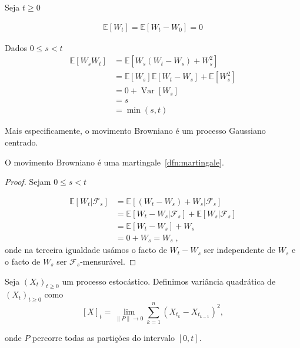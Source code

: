 \documentclass{article}
\begin{document}
Seja $t\geq 0$

\begin{align*}
    \mathbb{E}[W_t]=\mathbb{E}[W_t-W_0]=0
\end{align*}

Dados $0 \leq s <t$ 
\begin{align*}
    \mathbb{E}[W_sW_t]&=\mathbb{E}[W_s(W_t-W_s)+W_s^2]\\
                      &=\mathbb{E}[W_s]\mathbb{E}[W_t-W_s]+\mathbb{E}[W_s^2]\\
                      &=0 + \operatorname{Var}[W_s]\\
                      &=s\\
                      &=\min(s,t)
\end{align*}


\vspace{0.5cm}

Mais especificamente, o movimento Browniano é um processo Gaussiano centrado.

\vspace{0.5cm}

\begin{prop}
    O movimento Browniano é uma martingale~\ref{dfn:martingale}.
\end{prop}

\begin{proof}
    Sejam $0 \leq s <t$

    \begin{align*}
        \mathbb{E}[W_t |\mathcal{F}_s]&=\mathbb{E}[(W_t-W_s)+W_s|\mathcal{F}_s]\\
                                      &=\mathbb{E}[W_t-W_s|\mathcal{F}_s]+\mathbb{E}[W_s|\mathcal{F}_s]\\
                                      &=\mathbb{E}[W_t-W_s]+W_s\\
                                      &=0+W_s=W_s\;,
    \end{align*}
    onde na  terceira igualdade usámos o facto de $W_t-W_s$ ser independente de $W_s$ e o facto de $W_s$ ser $\mathcal{F}_s$-mensurável.
\end{proof}

\vspace{0.5 cm}

\begin{dfn}
    Seja $(X_t)_{t \geq 0}$ um processo estocástico. Definimos variância quadrática de $(X_t)_{t \geq 0}$ como
    $$[X]_t=\lim_{\|P\| \rightarrow 0}\sum_{k=1}^n(X_{t_k}-X_{t_{k-1}})^2,$$

    onde $P$ percorre todas as partições do intervalo $[0,t]$.
\end{dfn}
\end{document}
